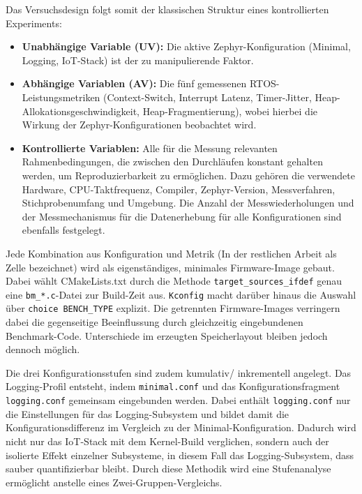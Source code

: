 Das Versuchsdesign folgt somit der klassischen Struktur eines kontrollierten Experiments:

\begin{itemize}
\item \textbf{Unabh{\"a}ngige Variable (UV):} Die aktive Zephyr-Konfiguration (Minimal, Logging, IoT-Stack) ist der zu manipulierende Faktor.
\item \textbf{Abh{\"a}ngige Variablen (AV):} Die f{\"u}nf gemessenen RTOS-Leistungsmetriken (Context-Switch, Interrupt Latenz, Timer-Jitter, Heap-Allokationsgeschwindigkeit, Heap-Fragmentierung), wobei hierbei die Wirkung der Zephyr-Konfigurationen beobachtet wird.
\item \textbf{Kontrollierte Variablen:} Alle f{\"u}r die Messung relevanten Rahmenbedingungen, die zwischen den Durchl{\"a}ufen konstant gehalten werden, um Reproduzierbarkeit zu erm{\"o}glichen. Dazu geh{\"o}ren die verwendete Hardware, CPU-Taktfrequenz, Compiler, Zephyr-Version, Messverfahren, Stichprobenumfang und Umgebung. Die Anzahl der Messwiederholungen und der Messmechanismus f{\"u}r die Datenerhebung f{\"u}r alle Konfigurationen sind ebenfalls festgelegt.
\end{itemize}
Jede Kombination aus Konfiguration und Metrik (In der restlichen Arbeit als \glqq{}Zelle\grqq{} bezeichnet) wird als eigenst{\"a}ndiges, minimales Firmware-Image gebaut. Dabei w{\"a}hlt CMakeLists.txt durch die Methode \lstinline[style=codeinline]|target_sources_ifdef| genau eine \lstinline[style=codeinline]|bm_*.c|-Datei zur Build-Zeit aus. \lstinline[style=codeinline]|Kconfig| macht dar{\"u}ber hinaus die Auswahl {\"u}ber \lstinline[style=codeinline]|choice BENCH_TYPE| explizit. Die getrennten Firmware-Images verringern dabei die gegenseitige Beeinflussung durch gleichzeitig eingebundenen Benchmark-Code. Unterschiede im erzeugten Speicherlayout bleiben jedoch dennoch m{\"o}glich.

Die drei Konfigurationsstufen sind zudem kumulativ/ inkrementell angelegt. Das Logging-Profil entsteht, indem \lstinline[style=codeinline]|minimal.conf| und das Konfigurationsfragment \lstinline[style=codeinline]|logging.conf| gemeinsam eingebunden werden. Dabei enth{\"a}lt \lstinline[style=codeinline]|logging.conf| nur die Einstellungen f{\"u}r das Logging-Subsystem und bildet damit die Konfigurationsdifferenz im Vergleich zu der Minimal-Konfiguration. Dadurch wird nicht nur das IoT-Stack mit dem Kernel-Build verglichen, sondern auch der isolierte Effekt einzelner Subsysteme, in diesem Fall das Logging-Subsystem, dass sauber quantifizierbar bleibt. Durch diese Methodik wird eine Stufenanalyse erm{\"o}glicht anstelle eines Zwei-Gruppen-Vergleichs.

